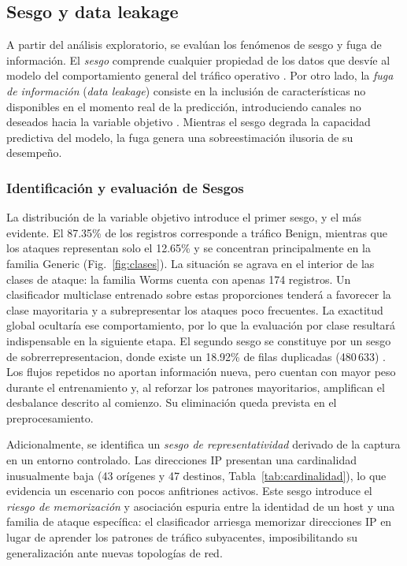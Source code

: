 \documentclass[conference]{IEEEtran}
\begin{document}
\FloatBarrier

\subsection{Sesgo y data leakage}

A partir del análisis exploratorio, se evalúan los fenómenos de sesgo y fuga de información. El \emph{sesgo} comprende cualquier propiedad de los datos que desvíe al modelo del comportamiento general del tráfico operativo \cite{mehrabi2021survey}. Por otro lado, la \emph{fuga de información} (\emph{data leakage}) consiste en la inclusión de características no disponibles en el momento real de la predicción, introduciendo canales no deseados hacia la variable objetivo \cite{kaufman2012leakage}. Mientras el sesgo degrada la capacidad predictiva del modelo, la fuga genera una sobreestimación ilusoria de su desempeño.
\subsubsection{Identificación y evaluación de Sesgos}

La distribución de la variable objetivo introduce el primer sesgo, y el más evidente. El 87.35\% de los registros corresponde a tráfico Benign, mientras que los ataques representan solo el 12.65\% y se concentran principalmente en la familia Generic (Fig.~\ref{fig:clases}). La situación se agrava en el interior de las clases de ataque: la familia Worms cuenta con apenas 174 registros. Un clasificador multiclase entrenado sobre estas proporciones tenderá a favorecer la clase mayoritaria y a subrepresentar los ataques poco frecuentes. La exactitud global ocultaría ese comportamiento, por lo que la evaluación por clase resultará indispensable en la siguiente etapa.
El segundo sesgo se constituye por un sesgo de sobrerrepresentacion, donde existe un 18.92\% de filas duplicadas (480\,633) . Los flujos repetidos no aportan información nueva, pero cuentan con mayor peso durante el entrenamiento y, al reforzar los patrones mayoritarios, amplifican el desbalance descrito al comienzo. Su eliminación queda prevista en el preprocesamiento.

Adicionalmente, se identifica un \emph{sesgo de representatividad} derivado de la captura en un entorno controlado. Las direcciones IP presentan una cardinalidad inusualmente baja (43 orígenes y 47 destinos, Tabla~\ref{tab:cardinalidad}), lo que evidencia un escenario con pocos anfitriones activos. Este sesgo introduce el \emph{riesgo de memorización} y asociación espuria entre la identidad de un host y una familia de ataque específica: el clasificador arriesga memorizar direcciones IP en lugar de aprender los patrones de tráfico subyacentes, imposibilitando su generalización ante nuevas topologías de red.
\end{document}
